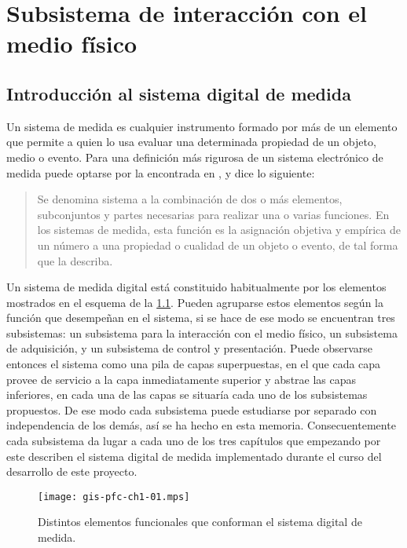 \chapter{Subsistema de interacción con el medio físico}

\section{Introducción al sistema digital de medida}

Un sistema de medida es cualquier instrumento formado por más de un elemento que permite a quien lo usa evaluar una determinada propiedad de un objeto, medio o evento. Para una definición más rigurosa de un sistema electrónico de medida puede optarse por la encontrada en \cite{pallas2004sas}, y dice lo siguiente:

{\small\begin{quotation}
	Se denomina sistema a la combinación de dos o más elementos, subconjuntos y partes necesarias para realizar una o varias funciones. En los sistemas de medida, esta función es la asignación objetiva y empírica de un número a una propiedad o cualidad de un objeto o evento, de tal forma que la describa.
\end{quotation}}

Un sistema de medida digital está constituido habitualmente por los elementos mostrados en el esquema de la \cref{fig:digmeasstm}. Pueden agruparse estos elementos según la función que desempeñan en el sistema, si se hace de ese modo se encuentran tres subsistemas: un subsistema para la interacción con el medio físico, un subsistema de adquisición, y un subsistema de control y presentación. Puede observarse entonces el sistema como una pila de capas superpuestas, en el que cada capa provee de servicio a la capa inmediatamente superior y abstrae las capas inferiores, en cada una de las capas se situaría cada uno de los subsistemas propuestos. De ese modo cada subsistema puede estudiarse por separado con independencia de los demás, así se ha hecho en esta memoria. Consecuentemente cada subsistema da lugar a cada uno de los tres capítulos que empezando por este describen el sistema digital de medida implementado durante el curso del desarrollo de este proyecto.\par

\begin{figure}
	\begin{center}
		\texttt{[image: gis-pfc-ch1-01.mps]}
	\end{center}
	\caption[Sistema digital de medida]{Distintos elementos funcionales que conforman el sistema digital de medida.}
	\label{fig:digmeasstm}
\end{figure}

